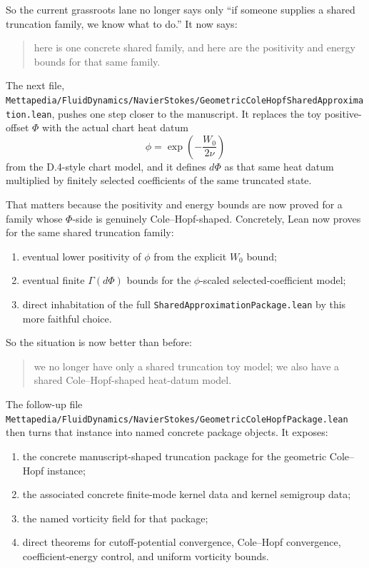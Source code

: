 \documentclass[11pt]{article}
\theoremstyle{remark}
\begin{document}
So the current grassroots lane no longer says only
``if someone supplies a shared truncation family, we know what to do.''  It now
says:
\begin{quote}
here is one concrete shared family, and here are the positivity and energy
bounds for that same family.
\end{quote}

The next file,
\texttt{Mettapedia/FluidDynamics/NavierStokes/GeometricColeHopfSharedApproximation.lean},
pushes one step closer to the manuscript.  It replaces the toy positive-offset
\(\Phi\) with the actual chart heat datum
\[
  \phi = \exp\!\left(-\frac{W_0}{2\nu}\right)
\]
from the D.4-style chart model, and it defines \(d\Phi\) as that same heat
datum multiplied by finitely selected coefficients of the same truncated state.

That matters because the positivity and energy bounds are now proved for a
family whose \(\Phi\)-side is genuinely Cole--Hopf-shaped.  Concretely, Lean
now proves for the same shared truncation family:
\begin{enumerate}[leftmargin=1.5em]
  \item eventual lower positivity of \(\phi\) from the explicit \(W_0\) bound;
  \item eventual finite \(\Gamma(d\Phi)\) bounds for the \(\phi\)-scaled
  selected-coefficient model;
  \item direct inhabitation of the full
  \texttt{SharedApproximationPackage.lean} by this more faithful choice.
\end{enumerate}

So the situation is now better than before:
\begin{quote}
we no longer have only a shared truncation toy model; we also have a shared
Cole--Hopf-shaped heat-datum model.
\end{quote}

The follow-up file
\texttt{Mettapedia/FluidDynamics/NavierStokes/GeometricColeHopfPackage.lean}
then turns that instance into named concrete package objects.  It exposes:
\begin{enumerate}[leftmargin=1.5em]
  \item the concrete manuscript-shaped truncation package for the geometric
  Cole--Hopf instance;
  \item the associated concrete finite-mode kernel data and kernel semigroup
  data;
  \item the named vorticity field for that package;
  \item direct theorems for cutoff-potential convergence, Cole--Hopf
  convergence, coefficient-energy control, and uniform vorticity bounds.
\end{enumerate}
\end{document}
